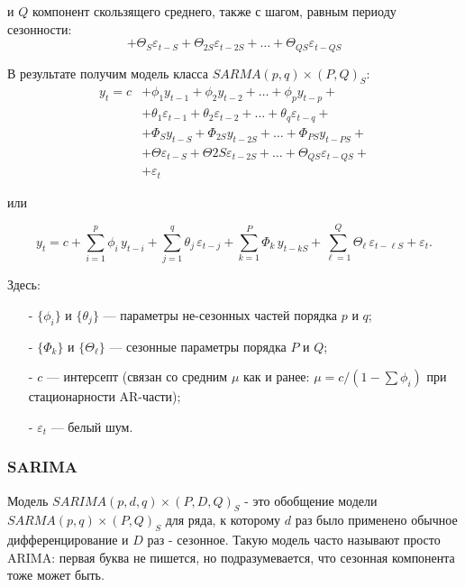 и $Q$ компонент скользящего среднего, также с шагом, равным периоду сезонности:
\begin{equation*}
    + \Theta_S \varepsilon_{t-S} + \Theta_{2S} \varepsilon_{t-2S} + \dots + \Theta_{QS} \varepsilon_{t-QS}
\end{equation*}

В результате получим модель класса $SARMA(p, q) \times (P, Q)_S$:
\begin{align*}
    y_t = c &+ \phi_1 y_{t-1} + \phi_2 y_{t-2} + \dots + \phi_p y_{t-p} + \\
    &+ \theta_1 \varepsilon_{t-1} + \theta_2 \varepsilon_{t-2} + \dots + \theta_q \varepsilon_{t-q} + \\
    &+ \Phi_S y_{t-S} + \Phi_{2S} y_{t-2S} + \dots + \Phi_{PS} y_{t-PS} + \\
    &+ \Theta \varepsilon_{t-S} + \Theta{2S} \varepsilon_{t-2S} + \dots + \Theta_{QS} \varepsilon_{t-QS} +\\
    &+ \varepsilon_t 
\end{align*}

\begin{flushleft}
    или
\end{flushleft}
\vspace{-5pt}
\begin{equation*}
    y_t = c
    + \sum_{i=1}^p \phi_i\,y_{t-i}
    + \sum_{j=1}^q \theta_j\,\varepsilon_{t-j}
    + \sum_{k=1}^P \Phi_k\,y_{t-kS}
    + \sum_{\ell=1}^Q \Theta_\ell\,\varepsilon_{t-\ell S}
    + \varepsilon_t.
\end{equation*}

Здесь:
\begin{itemize}
    \item[-] \(\{\phi_i\}\) и \(\{\theta_j\}\) — параметры не-сезонных частей порядка \(p\) и \(q\);  
    \item[-] \(\{\Phi_k\}\) и \(\{\Theta_\ell\}\) — сезонные параметры порядка \(P\) и \(Q\);  
    \item[-] \(c\) — интерсепт (связан со средним \(\mu\) как и ранее: \(\mu = c/(1-\sum\phi_i)\) 
    при стационарности AR-части);  
    \item[-] \(\varepsilon_t\) — белый шум.  
\end{itemize}

\subsubsection{SARIMA}

Модель $SARIMA(p, d, q) \times (P, D, Q)_S$ - это обобщение модели $SARMA(p, q) \times (P, Q)_S$ для ряда, 
к которому $d$ раз было применено обычное дифференцирование и $D$ раз - сезонное. 
Такую модель часто называют просто ARIMA:
первая буква не пишется, но подразумевается, что сезонная компонента тоже может быть.

